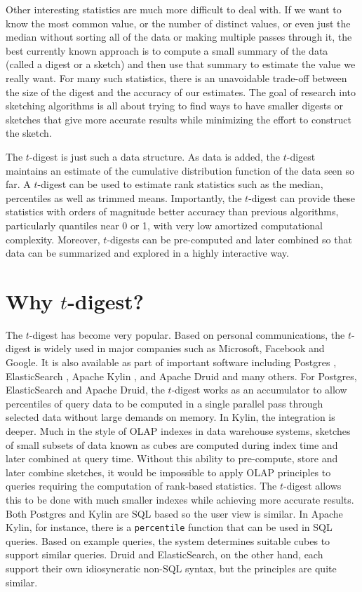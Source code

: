 \documentclass[preprint,12pt, a4paper]{elsarticle}
\begin{document}
Other interesting statistics are much more difficult to deal with. If we want to know the most common value, or the number of distinct values, or even just the median without sorting all of the data or making multiple passes through it, the best currently known approach is to compute a small summary of the data (called a digest or a sketch) and then use that summary to estimate the value we really want. For many such statistics, there is an unavoidable trade-off between the size of the digest and the accuracy of our estimates. The goal of research into sketching algorithms is all about trying to find ways to have smaller digests or sketches that give more accurate results while minimizing the effort to construct the sketch.

The $t$-digest is just such a data structure. As data is added, the $t$-digest maintains an estimate of the cumulative distribution function of the data seen so far. A $t$-digest can be used to estimate rank statistics such as the median, percentiles as well as trimmed means. Importantly, the $t$-digest can provide these statistics with orders of magnitude better accuracy than previous algorithms, particularly quantiles near 0 or 1, with very low amortized computational complexity. Moreover, $t$-digests can be pre-computed and later combined so that data can be summarized and explored in a highly interactive way.
\section{Why $t$-digest?}
The $t$-digest has become very popular. Based on personal communications, the $t$-digest is widely used in major companies such as Microsoft, Facebook and Google. It is also available as part of important software including Postgres \cite{postgres-t-digest}, ElasticSearch \cite{elastic, elastic-t-digest}, Apache Kylin \cite{kylin, kylin-t-digest}, and Apache Druid \cite{druid, druid-t-digest} and many others. For Postgres, ElasticSearch and Apache Druid, the $t$-digest works as an accumulator to allow percentiles of query data to be computed in a single parallel pass through selected data without large demands on memory. In Kylin, the integration is deeper. Much in the style of OLAP indexes in data warehouse systems, sketches of small subsets of data known as cubes are computed during index time and later combined at query time. Without this ability to pre-compute, store and later combine sketches, it would be impossible to apply OLAP principles to queries requiring the computation of rank-based statistics. The $t$-digest allows this to be done with much smaller indexes while achieving more accurate results. Both Postgres and Kylin are SQL based so the user view is similar. In Apache Kylin, for instance, there is a \texttt{percentile} function that can be used in SQL queries. Based on example queries, the system determines suitable cubes to support similar queries. Druid and ElasticSearch, on the other hand, each support their own idiosyncratic non-SQL syntax, but the principles are quite similar.
\end{document}
